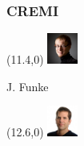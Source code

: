 \documentclass[aspectratio=169]{beamer}
\begin{document}
\begin{frame}
    \frametitle{CREMI}


    \begin{textblock}{3}(11.4,0)
        \tiny\includegraphics[width=1cm]{fig/people/funke.png}
        
        J. Funke%
    \end{textblock}%
    
    \begin{textblock}{3}(12.6,0)
        \tiny\includegraphics[width=1cm]{fig/people/bock.jpeg}
        

\end{textblock}
\end{frame}
\end{document}
